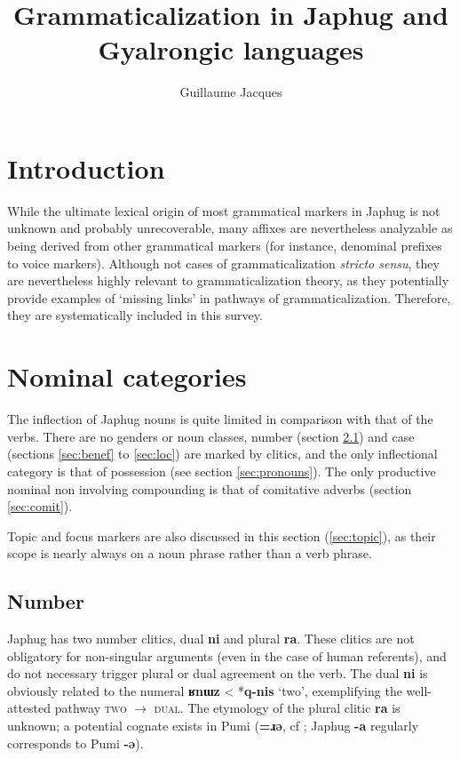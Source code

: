 \documentclass[oldfontcommands,oneside,a4paper,11pt]{article}
\newcommand{\ipa}[1]{\mbox{\phon\textbf{#1}}} %
\begin{document}
 
 \title{Grammaticalization in Japhug and Gyalrongic languages}
 \author{Guillaume Jacques}
 \maketitle  
 \section{Introduction}

While the ultimate lexical origin of most grammatical markers in Japhug is not unknown and probably unrecoverable, many affixes are nevertheless analyzable as being derived from other grammatical markers (for instance, denominal prefixes to voice markers). Although not cases of grammaticalization \textit{stricto sensu}, they are nevertheless  highly relevant to grammaticalization theory, as they potentially provide examples of `missing links' in pathways of grammaticalization. Therefore, they are systematically included in this survey.

 \section{Nominal categories} 
 
The inflection of Japhug nouns is quite limited in comparison with that of the verbs. There are no genders or noun classes, number (section \ref{sec:number}) and case (sections \ref{sec:benef} to \ref{sec:loc}) are marked by clitics, and the only inflectional category is that of possession (see section \ref{sec:pronouns}).  The only productive nominal non involving compounding is that of comitative adverbs (section \ref{sec:comit}).

Topic and focus markers are also discussed in this section (\ref{sec:topic}), as their scope is nearly always on a noun phrase rather than a verb phrase.

\subsection{Number} \label{sec:number}

Japhug has two number clitics, dual \ipa{ni} and plural \ipa{ra}. These clitics are not obligatory for non-singular arguments (even in the case of human referents), and do not necessary trigger plural or dual agreement on the verb. The dual \ipa{ni} is obviously related to the numeral \ipa{ʁnɯz} < *\ipa{q-nis} `two', exemplifying the well-attested pathway \textsc{two} $\rightarrow$ \textsc{dual}. The etymology of the plural clitic \ipa{ra} is unknown; a potential cognate exists in Pumi (\ipa{=ɹə}, cf \citealt[135]{daudey14grammar}; Japhug \ipa{-a} regularly corresponds to Pumi \ipa{-ə}).
 
\end{document}
